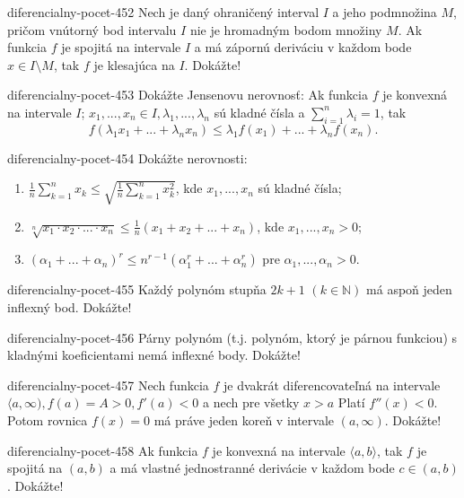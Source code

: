 \begin{defproblem}{diferencialny-pocet-452}
Nech je daný ohraničený interval $I$ a jeho podmnožina $M$, pričom vnútorný bod intervalu $I$ nie je hromadným bodom množiny $M$. Ak funkcia $f$ je spojitá na intervale $I$ a má zápornú deriváciu v každom bode $x\in I\setminus M$, tak $f$ je klesajúca na $I$. Dokážte!
\end{defproblem}

\begin{defproblem}{diferencialny-pocet-453}
Dokážte Jensenovu nerovnosť: Ak funkcia $f$ je konvexná na intervale $I$; $x_1,...,x_n\in I,\lambda_1,...,\lambda_n$ sú kladné čísla a $\sum_{i=1}^n \lambda_i=1$, tak
$$f(\lambda_1x_1+...+\lambda_nx_n)\leq \lambda_1f(x_1)+...+\lambda_nf(x_n).$$
\end{defproblem}

\begin{defproblem}{diferencialny-pocet-454}
Dokážte nerovnosti:
\begin{enumerate}
\item $\frac{1}{n}\sum_{k=1}^n x_k\leq \sqrt{\frac{1}{n}\sum_{k=1}^n x^2_{k}}$, kde $x_1,...,x_n$ sú kladné čísla;
\item $\sqrt[n]{x_1\cdot x_2\cdot...\cdot x_n}\leq \frac{1}{n}(x_1+x_2+...+x_n)$, kde $x_1,...,x_n>0$;
\item $(\alpha_1+...+\alpha_n)^r\leq n^{r-1}(\alpha^r_1+...+\alpha^r_n)$ pre $\alpha_1,...,\alpha_n>0$.
\end{enumerate}
\end{defproblem}

\begin{defproblem}{diferencialny-pocet-455}
Každý polynóm stupňa $2k+1$ $(k\in\mathbb{N})$ má aspoň jeden inflexný bod. Dokážte!
\end{defproblem}

\begin{defproblem}{diferencialny-pocet-456}
Párny polynóm (t.j. polynóm, ktorý je párnou funkciou) s kladnými koeficientami nemá inflexné body. Dokážte!
\end{defproblem}

\begin{defproblem}{diferencialny-pocet-457}
Nech funkcia $f$ je dvakrát diferencovateľná na intervale $\langle a,\infty),f(a)=A>0,f'(a)<0$ a nech pre všetky $x>a$ Platí $f''(x)<0$. Potom rovnica $f(x)=0$ má práve jeden koreň v intervale $(a,\infty)$. Dokážte!
\end{defproblem}

\begin{defproblem}{diferencialny-pocet-458}
Ak funkcia $f$ je konvexná na intervale $\langle a,b \rangle$, tak $f$ je spojitá na $(a,b)$ a má vlastné jednostranné derivácie v každom bode $c\in (a,b)$. Dokážte!
\end{defproblem}

